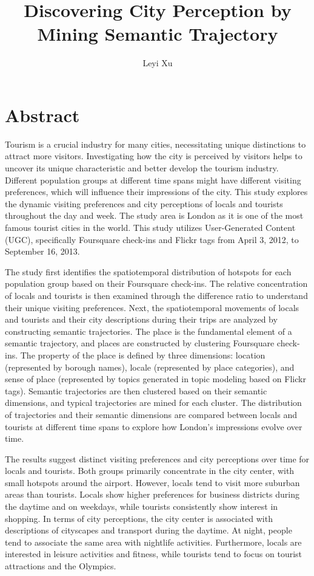 \documentclass{article}
\title{Discovering City Perception by Mining Semantic Trajectory}
\author{Leyi Xu}
\theoremstyle{remark}
\begin{document}
\maketitle
\newpage



\chapter{\Large\textbf{Abstract}}

\vspace{3cm}

Tourism is a crucial industry for many cities, necessitating unique distinctions to attract more visitors. Investigating how the city is perceived by visitors helps to uncover its unique characteristic and better develop the tourism industry. Different population groups at different time spans might have different visiting preferences, which will influence their impressions of the city. This study explores the dynamic visiting preferences and city perceptions of locals and tourists throughout the day and week. The study area is London as it is one of the most famous tourist cities in the world. This study utilizes User-Generated Content (UGC), specifically Foursquare check-ins and Flickr tags from April 3, 2012, to September 16, 2013.

The study first identifies the spatiotemporal distribution of hotspots for each population group based on their Foursquare check-ins. The relative concentration of locals and tourists is then examined through the difference ratio to understand their unique visiting preferences. Next, the spatiotemporal movements of locals and tourists and their city descriptions during their trips are analyzed by constructing semantic trajectories. The place is the fundamental element of a semantic trajectory, and places are constructed by clustering Foursquare check-ins. The property of the place is defined by three dimensions: location (represented by borough names), locale (represented by place categories), and sense of place (represented by topics generated in topic modeling based on Flickr tags). Semantic trajectories are then clustered based on their semantic dimensions, and typical trajectories are mined for each cluster. The distribution of trajectories and their semantic dimensions are compared between locals and tourists at different time spans to explore how London's impressions evolve over time.

The results suggest distinct visiting preferences and city perceptions over time for locals and tourists. Both groups primarily concentrate in the city center, with small hotspots around the airport. However, locals tend to visit more suburban areas than tourists. Locals show higher preferences for business districts during the daytime and on weekdays, while tourists consistently show interest in shopping. In terms of city perceptions, the city center is associated with descriptions of cityscapes and transport during the daytime. At night, people tend to associate the same area with nightlife activities. Furthermore, locals are interested in leisure activities and fitness, while tourists tend to focus on tourist attractions and the Olympics.
\end{document}
